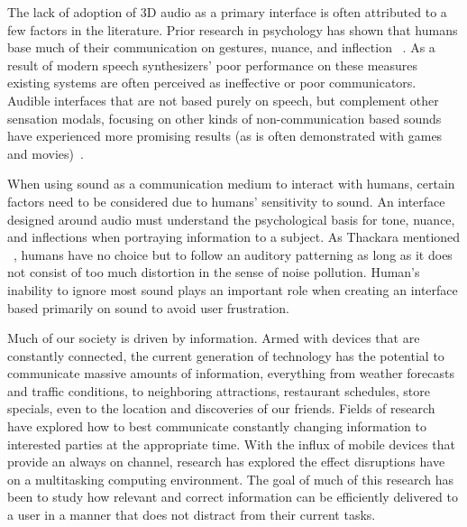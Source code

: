 The lack of adoption of 3D audio as a primary interface is often attributed to a
few factors in the literature. Prior research in psychology has shown that
humans base much of their communication on gestures, nuance, and inflection
~\cite{thackara2005bubble}. As a result of modern speech synthesizers’ poor
performance on these measures existing systems are often perceived as
ineffective or poor communicators. Audible interfaces that are not based purely
on speech, but complement other sensation modals, focusing on other kinds of
non-communication based  sounds have experienced more promising results (as is
often demonstrated with games and movies)~\cite{thackara2005bubble}.

When using sound as a communication medium to interact with humans, certain
factors need to be considered due to humans’ sensitivity to sound. An interface
designed around audio must understand the psychological basis for tone, nuance,
and inflections when portraying information to a subject. As Thackara mentioned
~\cite{thackara2005bubble}, humans have no choice but to follow an auditory
patterning as long as it does not consist of too much distortion in the sense of
noise pollution. Human’s inability to ignore most sound plays an important role
when creating an interface based primarily on sound to avoid user frustration.

Much of our society is driven by information. Armed with devices that are
constantly connected, the current generation of technology has the potential to
communicate massive amounts of information, everything from weather forecasts
and traffic conditions, to neighboring attractions, restaurant schedules, store
specials, even to the location and discoveries of our friends. Fields of
research have explored how to best communicate constantly changing information
to interested parties at the appropriate time.  With the influx of mobile
devices that provide an always on channel, research has explored the effect
disruptions have on a multitasking computing environment. The goal of much of
this research has been to study how relevant and correct information can be
efficiently delivered to a user in a manner that does not distract from their
current tasks\cite{McCrickard2003509}.


